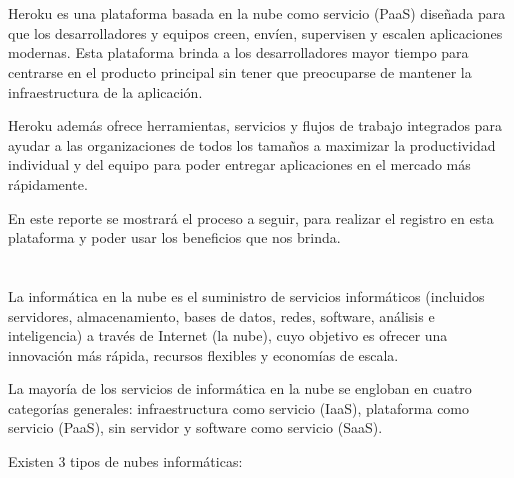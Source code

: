 \documentclass[10pt,a4paper]{article} %
\begin{document}
	\section{}%
	{\large Heroku es una plataforma basada en la nube como servicio (PaaS) dise{\~n}ada para que los desarrolladores y equipos creen, env{\'i}en, supervisen y escalen aplicaciones modernas. Esta plataforma brinda a los desarrolladores mayor tiempo para centrarse en el producto principal sin tener que preocuparse de mantener la infraestructura de la aplicaci{\'o}n.  
		
		
		\vspace{0.5cm}
		Heroku adem{\'a}s ofrece herramientas, servicios y flujos de trabajo integrados para ayudar a las organizaciones de todos los tama{\~n}os a maximizar la productividad individual y del equipo para poder entregar aplicaciones en el mercado m{\'a}s r{\'a}pidamente.
		
		\vspace{0.5cm}
		En este reporte se mostrar{\'a} el proceso a seguir, para realizar el registro en esta plataforma y poder usar los beneficios que nos brinda.}
	
	
	\pagebreak
	
	\section{\color{colorIPN}{Conceptos}}
	
	\subsection{ }
	{\large La inform{\'a}tica en la nube es el suministro de servicios inform{\'a}ticos (incluidos servidores, almacenamiento, bases de datos, redes, software, an{\'a}lisis e inteligencia) a trav{\'e}s de Internet (la nube), cuyo objetivo es ofrecer una innovaci{\'o}n m{\'a}s r{\'a}pida, recursos flexibles y econom{\'i}as de escala.
		
		
		\vspace{0.5cm}
		La mayor{\'i}a de los servicios de inform{\'a}tica en la nube se engloban en cuatro categor{\'i}as generales: infraestructura como servicio (IaaS), plataforma como servicio (PaaS), sin servidor y software como servicio (SaaS).
		
		
		\vspace{0.5cm}
		Existen 3 tipos de nubes inform{\'a}ticas:}
	
\end{document}
